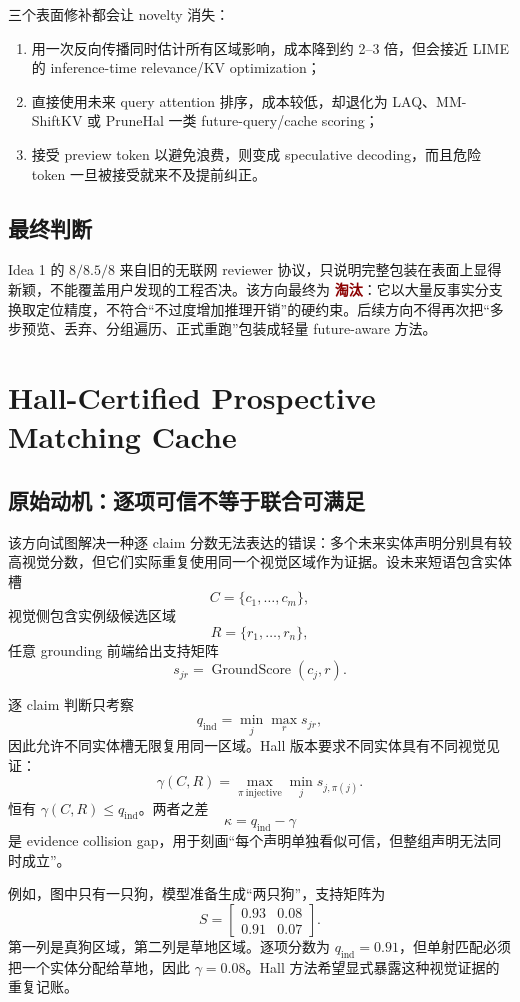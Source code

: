 \documentclass[UTF8,zihao=-4,a4paper]{ctexart}
\newcommand{\reject}{\textcolor{darkred}{\textbf{淘汰}}}
\begin{document}
三个表面修补都会让 novelty 消失：

\begin{enumerate}
  \item 用一次反向传播同时估计所有区域影响，成本降到约 2--3 倍，但会接近 LIME 的 inference-time relevance/KV optimization；
  \item 直接使用未来 query attention 排序，成本较低，却退化为 LAQ、MM-ShiftKV 或 PruneHal 一类 future-query/cache scoring；
  \item 接受 preview token 以避免浪费，则变成 speculative decoding，而且危险 token 一旦被接受就来不及提前纠正。
\end{enumerate}

\subsection{最终判断}

Idea 1 的 $8/8.5/8$ 来自旧的无联网 reviewer 协议，只说明完整包装在表面上显得新颖，不能覆盖用户发现的工程否决。该方向最终为 \reject：它以大量反事实分支换取定位精度，不符合“不过度增加推理开销”的硬约束。后续方向不得再次把“多步预览、丢弃、分组遍历、正式重跑”包装成轻量 future-aware 方法。

\section{Hall-Certified Prospective Matching Cache}
\label{sec:hall-cache}

\subsection{原始动机：逐项可信不等于联合可满足}

该方向试图解决一种逐 claim 分数无法表达的错误：多个未来实体声明分别具有较高视觉分数，但它们实际重复使用同一个视觉区域作为证据。设未来短语包含实体槽
\[
C=\{c_1,\ldots,c_m\},
\]
视觉侧包含实例级候选区域
\[
R=\{r_1,\ldots,r_n\},
\]
任意 grounding 前端给出支持矩阵
\[
s_{jr}=\operatorname{GroundScore}(c_j,r).
\]

逐 claim 判断只考察
\[
q_{\mathrm{ind}}=\min_j\max_r s_{jr},
\]
因此允许不同实体槽无限复用同一区域。Hall 版本要求不同实体具有不同视觉见证：
\[
\gamma(C,R)
=
\max_{\pi\ \mathrm{injective}}
\min_j s_{j,\pi(j)}.
\]
恒有 $\gamma(C,R)\le q_{\mathrm{ind}}$。两者之差
\[
\kappa=q_{\mathrm{ind}}-\gamma
\]
是 evidence collision gap，用于刻画“每个声明单独看似可信，但整组声明无法同时成立”。

例如，图中只有一只狗，模型准备生成“两只狗”，支持矩阵为
\[
S=
\begin{bmatrix}
0.93 & 0.08\\
0.91 & 0.07
\end{bmatrix}.
\]
第一列是真狗区域，第二列是草地区域。逐项分数为 $q_{\mathrm{ind}}=0.91$，但单射匹配必须把一个实体分配给草地，因此 $\gamma=0.08$。Hall 方法希望显式暴露这种视觉证据的重复记账。
\end{document}
